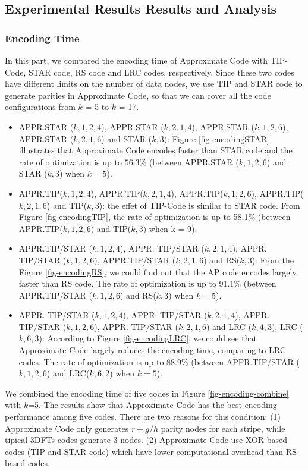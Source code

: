 \documentclass[sigconf]{acmart}
\begin{document}
\subsection{Experimental Results Results and Analysis}

\subsubsection{Encoding Time}
In this part, we compared the encoding time of Approximate Code with TIP-Code, STAR code, RS code and LRC codes, respectively.
Since these two codes have different limits on the number of data nodes, we use TIP and STAR code to generate parities in Approximate Code, so that we can cover all the code configurations from $k$ = 5 to $k$ = 17.
\begin{itemize}
    \item APPR.STAR ($k,1,2,4$), APPR.STAR ($k,2,1,4$), APPR.STAR ($k,1,2,6$), APPR.STAR ($k,2,1,6$) and STAR ($k,3$): Figure \ref{fig-encodingSTAR} illustrates that Approximate Code encodes faster than STAR code and the rate of optimization is up to $56.3\%$ (between APPR.STAR ($k,1,2,6$) and STAR ($k,3$) when $k = 5$).

    \item APPR.TIP($k,1,2,4$), APPR.TIP($k,2,1,4$), APPR.TIP($k,1,2,6$), APPR.TIP($k,2,1,6$) and TIP($k,3$): the effet of TIP-Code is similar to STAR code. From Figure \ref{fig-encodingTIP}, the rate of optimization is up to 58.1\% (between APPR.TIP($k,1,2,6$) and TIP($k,3$) when k = 9).

    \item APPR.TIP/STAR ($k,1,2,4$), APPR. TIP/STAR ($k,2,1,4$), APPR. TIP/STAR ($k,1,2,6$), APPR.TIP/STAR ($k,2,1,6$) and RS($k,3$): From the Figure \ref{fig-encodingRS}, we could find out that the AP code encodes largely faster than RS code. The rate of optimization is up to 91.1\% (between APPR.TIP/STAR ($k,1,2,6$) and RS($k,3$) when $k = 5$).

    \item APPR. TIP/STAR ($k,1,2,4$), APPR. TIP/STAR ($k,2,1,4$), APPR. TIP/STAR ($k,1,2,6$), APPR. TIP/STAR ($k,2,1,6$) and LRC ($k,4,3$), LRC ($k,6,3$): According to Figure \ref{fig-encodingLRC}, we could see that Approximate Code largely reduces the encoding time, comparing to LRC codes. The rate of optimization is up to 88.9\% (between APPR.TIP/STAR ($k,1,2,6$) and LRC($k, 6, 2$) when $k = 5$).
\end{itemize}

We combined the encoding time of five codes in Figure \ref{fig-encoding-combine} with $k$=5. The results show that Approximate Code has the best encoding performance among five codes. There are two reasons for this condition: (1) Approximate Code only generates $r+g/h$ parity nodes for each stripe, while tipical 3DFTs codes generate 3 nodes. (2) Approximate Code use XOR-based codes (TIP and STAR code) which have lower computational overhead than RS-based codes.\par
\end{document}
